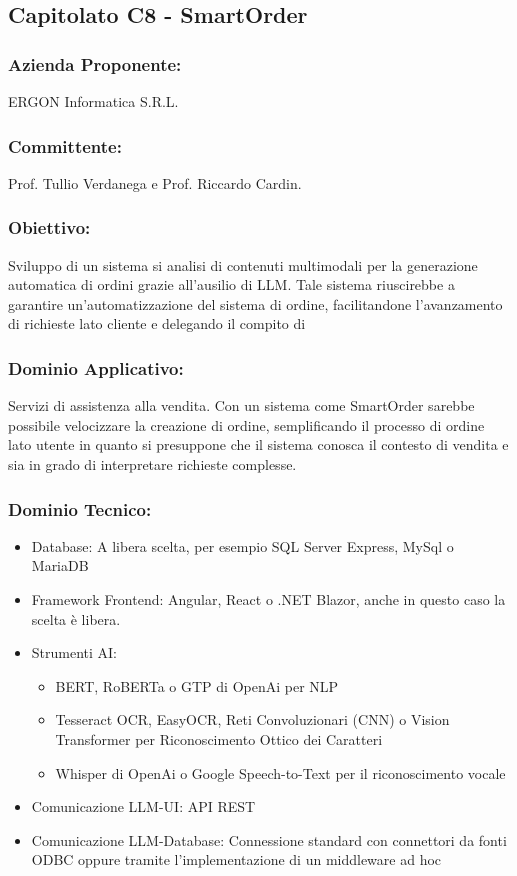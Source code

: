 \documentclass[a4paper,12pt]{article}
\begin{document}
\subsection{ Capitolato C8 - SmartOrder}
\subsubsection*{Azienda Proponente:} ERGON Informatica S.R.L.
\subsubsection*{Committente:} Prof. Tullio Verdanega e Prof. Riccardo Cardin.
\subsubsection*{Obiettivo:} Sviluppo di un sistema si analisi di contenuti multimodali per la generazione automatica di ordini grazie all'ausilio di LLM. Tale sistema riuscirebbe a garantire un'automatizzazione del sistema di ordine, facilitandone l'avanzamento di richieste lato cliente e delegando il compito di 
\subsubsection*{Dominio Applicativo:} Servizi di assistenza alla vendita. Con un sistema come SmartOrder sarebbe possibile velocizzare la creazione di ordine, semplificando il processo di ordine lato utente in quanto si presuppone che il sistema conosca il contesto di vendita e sia in grado di interpretare richieste complesse.
\subsubsection*{Dominio Tecnico:}
\begin{itemize}
    \item Database: A libera scelta, per esempio SQL Server Express, MySql o MariaDB
    \item Framework Frontend: Angular, React o .NET Blazor, anche in questo caso la scelta è libera.
    \item Strumenti AI: \begin{itemize}
                            \item BERT, RoBERTa o GTP di OpenAi per NLP
                            \item Tesseract OCR, EasyOCR, Reti Convoluzionari (CNN) o Vision Transformer per Riconoscimento Ottico dei Caratteri
                            \item Whisper di OpenAi o Google Speech-to-Text per il riconoscimento vocale
                        \end{itemize}
    \item Comunicazione LLM-UI: API REST
    \item Comunicazione LLM-Database: Connessione standard con connettori da fonti ODBC oppure tramite l'implementazione di un middleware ad hoc
\end{itemize}
\end{document}
